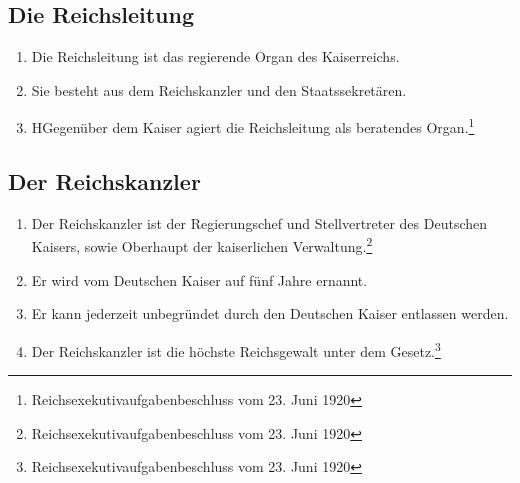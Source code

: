 \documentclass{article}
\begin{document}
\subsection{Die Reichsleitung}
\begin{enumerate}[(1)]
    \item Die Reichsleitung ist das regierende Organ des Kaiserreichs.
    \item Sie besteht aus dem Reichskanzler und den Staatssekretären.
    \item HGegenüber dem Kaiser agiert die Reichsleitung als beratendes Organ.\footnote{Reichsexekutivaufgabenbeschluss vom 23. Juni 1920}
\end{enumerate}

\subsection{Der Reichskanzler}
\begin{enumerate}[(1)]
    \item Der Reichskanzler ist der Regierungschef und Stellvertreter des Deutschen Kaisers, sowie Oberhaupt der kaiserlichen Verwaltung.\footnote{Reichsexekutivaufgabenbeschluss vom 23. Juni 1920}
    \item Er wird vom Deutschen Kaiser auf fünf Jahre ernannt.
    \item Er kann jederzeit unbegründet durch den Deutschen Kaiser entlassen werden.
    \item Der Reichskanzler ist die höchste Reichsgewalt unter dem Gesetz.\footnote{Reichsexekutivaufgabenbeschluss vom 23. Juni 1920}
\end{enumerate}
\end{document}
